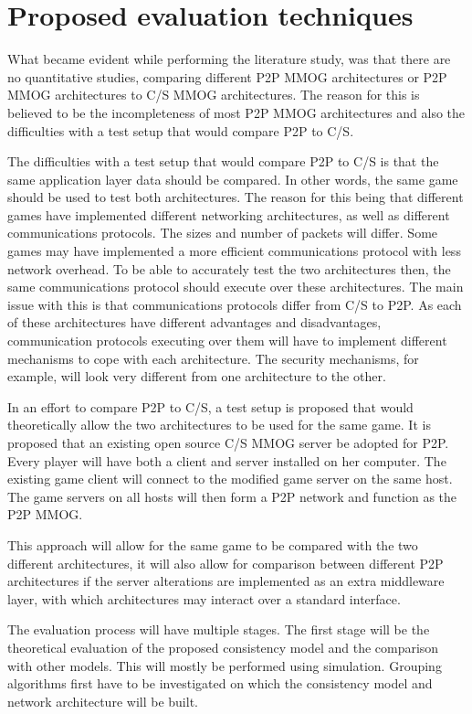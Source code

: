 \documentclass[journal,oneside,a4paper,onecolumn]{IEEEtran}
\begin{document}
\section{Proposed evaluation techniques}
\label{evaluation_techniques}

What became evident while performing the literature study, was that there are no quantitative studies, comparing different P2P MMOG architectures or P2P MMOG architectures to C/S MMOG architectures. The reason for this is believed to be the incompleteness of most P2P MMOG architectures and also the difficulties with a test setup that would compare P2P to C/S.

The difficulties with a test setup that would compare P2P to C/S is that the same application layer data should be compared. In other words, the same game should be used to test both architectures. The reason for this being that different games have implemented different networking architectures, as well as different communications protocols. The sizes and number of packets will differ. Some games may have implemented a more efficient communications protocol with less network overhead. To be able to accurately test the two architectures then, the same communications protocol should execute over these architectures. The main issue with this is that communications protocols differ from C/S to P2P. As each of these architectures have different advantages and disadvantages, communication protocols executing over them will have to implement different mechanisms to cope with each architecture. The security mechanisms, for example, will look very different from one architecture to the other.

In an effort to compare P2P to C/S, a test setup is proposed that would theoretically allow the two architectures to be used for the same game. It is proposed that an existing open source C/S MMOG server be adopted for P2P. Every player will have both a client and server installed on her computer. The existing game client will connect to the modified game server on the same host. The game servers on all hosts will then form a P2P network and function as the P2P MMOG.

This approach will allow for the same game to be compared with the two different architectures, it will also allow for comparison between different P2P architectures if the server alterations are implemented as an extra middleware layer, with which architectures may interact over a standard interface.

The evaluation process will have multiple stages. The first stage will be the theoretical evaluation of the proposed consistency model and the comparison with other models. This will mostly be performed using simulation. Grouping algorithms first have to be investigated on which the consistency model and network architecture will be built.
\end{document}
